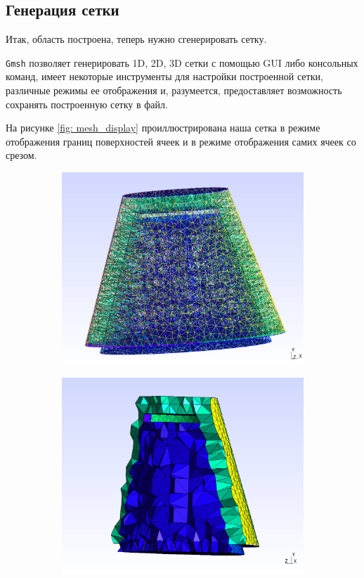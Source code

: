 \documentclass[a4paper, 14pt]{extreport}
\begin{document}
\subsection{Генерация сетки}

Итак, область построена, теперь нужно сгенерировать сетку.

\texttt{Gmsh} позволяет генерировать 1D, 2D, 3D сетки с помощью 
GUI либо консольных команд, имеет некоторые инструменты
для настройки построенной сетки, различные режимы ее отображения
и, разумеется, предоставляет возможность сохранять построенную сетку в файл.

На рисунке \ref{fig: mesh_display}
проиллюстрирована наша сетка в режиме отображения границ
поверхностей ячеек и в режиме отображения самих ячеек со срезом.

\begin{figure}[H]
	\begin{subfigure}[h]{0.5\textwidth}
		\includegraphics[scale=0.23]{pictures/mesh_surfaces_edges_full.png}
	\end{subfigure}
	\begin{subfigure}[h]{0.5\textwidth}
		\includegraphics[scale=0.23]{pictures/mesh_volumes_slice.png}

\end{subfigure}
\end{figure}
\end{document}
